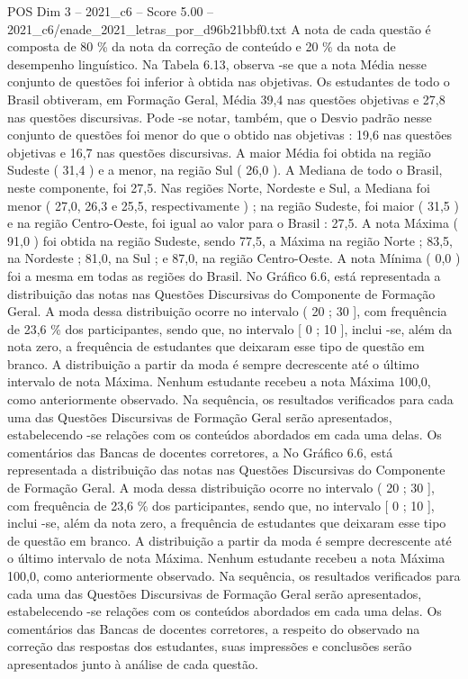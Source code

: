 \begin{textsample}{POS Dim 3 – 2021\_c6 – Score 5.00 – 2021\_c6/enade\_2021\_letras\_por\_d96b21bbf0.txt}
A nota de cada questão é composta de 80 \% da nota da correção de conteúdo e 20 \% da nota de desempenho linguístico.
Na Tabela 6.13, observa -se que a nota Média nesse conjunto de questões foi inferior à obtida nas objetivas.
Os estudantes de todo o Brasil obtiveram, em Formação Geral, Média 39,4 nas questões objetivas e 27,8 nas questões discursivas.
Pode -se notar, também, que o Desvio padrão nesse conjunto de questões foi menor do que o obtido nas objetivas : 19,6 nas questões objetivas e 16,7 nas questões discursivas.
A maior Média foi obtida na região Sudeste ( 31,4 ) e a menor, na região Sul ( 26,0 ).
A Mediana de todo o Brasil, neste componente, foi 27,5.
Nas regiões Norte, Nordeste e Sul, a Mediana foi menor ( 27,0, 26,3 e 25,5, respectivamente ) ; na região Sudeste, foi maior ( 31,5 ) e na região Centro-Oeste, foi igual ao valor para o Brasil : 27,5.
A nota Máxima ( 91,0 ) foi obtida na região Sudeste, sendo 77,5, a Máxima na região Norte ; 83,5, na Nordeste ; 81,0, na Sul ; e 87,0, na região Centro-Oeste.
A nota Mínima ( 0,0 ) foi a mesma em todas as regiões do Brasil.
No Gráfico 6.6, está representada a distribuição das notas nas Questões Discursivas do Componente de Formação Geral.
A moda dessa distribuição ocorre no intervalo ( 20 ; 30 ], com frequência de 23,6 \% dos participantes, sendo que, no intervalo [ 0 ; 10 ], inclui -se, além da nota zero, a frequência de estudantes que deixaram esse tipo de questão em branco.
A distribuição a partir da moda é sempre decrescente até o último intervalo de nota Máxima.
Nenhum estudante recebeu a nota Máxima 100,0, como anteriormente observado.
Na sequência, os resultados verificados para cada uma das Questões Discursivas de Formação Geral serão apresentados, estabelecendo -se relações com os conteúdos abordados em cada uma delas.
Os comentários das Bancas de docentes corretores, a No Gráfico 6.6, está representada a distribuição das notas nas Questões Discursivas do Componente de Formação Geral.
A moda dessa distribuição ocorre no intervalo ( 20 ; 30 ], com frequência de 23,6 \% dos participantes, sendo que, no intervalo [ 0 ; 10 ], inclui -se, além da nota zero, a frequência de estudantes que deixaram esse tipo de questão em branco.
A distribuição a partir da moda é sempre decrescente até o último intervalo de nota Máxima.
Nenhum estudante recebeu a nota Máxima 100,0, como anteriormente observado.
Na sequência, os resultados verificados para cada uma das Questões Discursivas de Formação Geral serão apresentados, estabelecendo -se relações com os conteúdos abordados em cada uma delas.
Os comentários das Bancas de docentes corretores, a respeito do observado na correção das respostas dos estudantes, suas impressões e conclusões serão apresentados junto à análise de cada questão.

\end{textsample}
